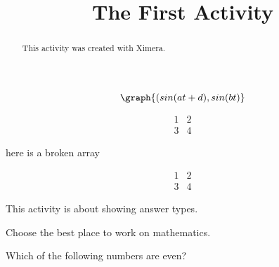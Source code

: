 \documentclass{ximera}
\title{The First Activity}
\begin{document}
  
\begin{abstract}  
This activity was created with Ximera.
\end{abstract}  
\maketitle
\begin{image}
    \end{image}

\begin{onlineOnly}
  \[
  \graph{(sin(a t + d),sin(b t)}
  \]
\end{onlineOnly}


\begin{onlineOnly}
  \begin{center}
  \end{center}
\end{onlineOnly}

\[
\begin{array}{|c|c|}
  1 & 2 \\
  3 & 4
\end{array}
\]

here is a broken array

\[
\begin{array}{|c|c|}
  1 & 2 \\
  
  3 & 4
\end{array}
\]


This activity is about showing answer types.
\begin{problem}  
  Choose the best place to work on mathematics.  
  \begin{multipleChoice}  
  \end{multipleChoice}
\end{problem}


\begin{problem}  
  Which of the following numbers are even?  
  \begin{selectAll}  
  \end{selectAll}  
\end{problem}
\end{document}
